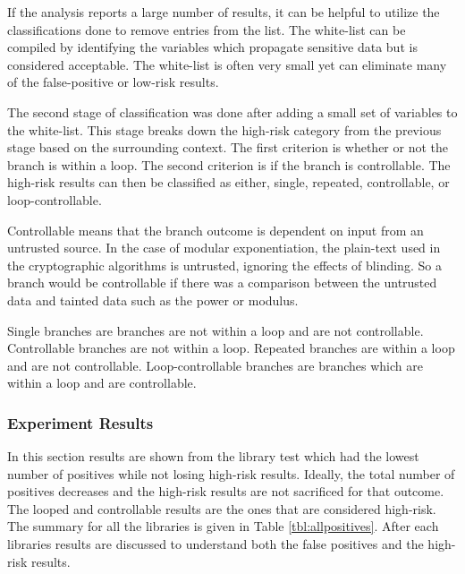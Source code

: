  If the analysis reports a large number of results, it can be helpful to utilize
 the classifications done to remove entries from the list. The white-list can be
 compiled by identifying the variables which propagate sensitive data but is
 considered acceptable. The white-list is often very small yet can eliminate
 many of the false-positive or low-risk results.

 The second stage of classification was done after adding a small set of
 variables to the white-list. This stage breaks down the high-risk category from the
 previous stage based on the surrounding context. The first criterion is whether
 or not the branch is within a loop. The second criterion is if the branch is
 controllable. The high-risk results can then be classified as either, single,
 repeated, controllable, or loop-controllable.

 Controllable means that the branch outcome is dependent on input from an
 untrusted source. In the case of modular exponentiation, the plain-text used in
 the cryptographic algorithms is untrusted, ignoring the effects of blinding. So
 a branch would be controllable if there was a comparison between the untrusted
 data and tainted data such as the power or modulus.

 Single branches are branches are not within a loop and are not controllable.
 Controllable branches are not within a loop. Repeated branches are within a
 loop and are not controllable. Loop-controllable branches are branches which
 are within a loop and are controllable.

\subsubsection{Experiment Results}

    In this section results are shown from the library test which had the lowest
    number of positives while not losing high-risk results. Ideally, the total
    number of positives decreases and the high-risk results are not sacrificed
    for that outcome. The looped and controllable results are the ones that are
    considered high-risk. The summary for all the libraries is given in Table
    \ref{tbl:allpositives}. After each libraries results are discussed to
    understand both the false positives and the high-risk results.

